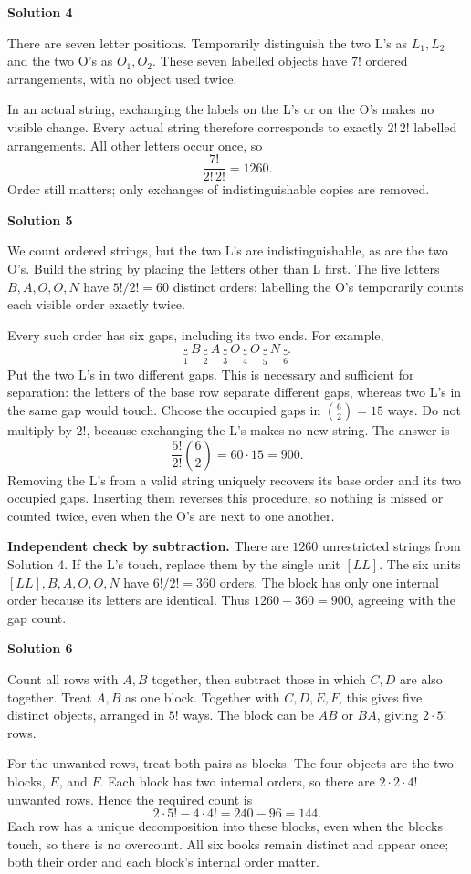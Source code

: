 \documentclass[11pt]{article}
\newcommand{\solution}[1]{%
  \par\Needspace{5\baselineskip}\addvspace{.8\baselineskip}%
  {\large\bfseries Solution #1\par}\nopagebreak[4]}
\begin{document}
\solution{4}
There are seven letter positions. Temporarily distinguish the two L's
as $L_1,L_2$ and the two O's as $O_1,O_2$. These seven labelled objects
have $7!$ ordered arrangements, with no object used twice.

In an actual string, exchanging the labels on the L's or on the O's
makes no visible change. Every actual string therefore corresponds to
exactly $2!\,2!$ labelled arrangements. All other letters occur once, so
\[
\frac{7!}{2!\,2!}=\boxed{1260}.
\]
Order still matters; only exchanges of indistinguishable copies are removed.



\clearpage
\solution{5}
We count ordered strings, but the two L's are indistinguishable, as are
the two O's. Build the string by placing the letters other than L first.
The five letters $B,A,O,O,N$ have $5!/2!=60$ distinct orders: labelling
the O's temporarily counts each visible order exactly twice.

Every such order has six gaps, including its two ends. For example,
\[
\underbrace{\square}_{1}\ B\
\underbrace{\square}_{2}\ A\
\underbrace{\square}_{3}\ O\
\underbrace{\square}_{4}\ O\
\underbrace{\square}_{5}\ N\
\underbrace{\square}_{6}.
\]
Put the two L's in two different gaps. This is necessary and sufficient
for separation: the letters of the base row separate different gaps,
whereas two L's in the same gap would touch. Choose the occupied gaps in
$\binom62=15$ ways. Do not multiply by $2!$, because exchanging the L's
makes no new string. The answer is
\[
\frac{5!}{2!}\binom62=60\cdot15=\boxed{900}.
\]
Removing the L's from a valid string uniquely recovers its base order
and its two occupied gaps. Inserting them reverses this procedure, so
nothing is missed or counted twice, even when the O's are next to one
another.

\textbf{Independent check by subtraction.} There are $1260$ unrestricted
strings from Solution 4. If the L's touch, replace them by the single
unit $[LL]$. The six units $[LL],B,A,O,O,N$ have $6!/2!=360$ orders.
The block has only one internal order because its letters are identical.
Thus $1260-360=900$, agreeing with the gap count.

\solution{6}
Count all rows with $A,B$ together, then subtract those in which $C,D$
are also together. Treat $A,B$ as one block. Together with $C,D,E,F$,
this gives five distinct objects, arranged in $5!$ ways. The block can
be $AB$ or $BA$, giving $2\cdot5!$ rows.

For the unwanted rows, treat both pairs as blocks. The four objects
are the two blocks, $E$, and $F$. Each block has two internal orders,
so there are $2\cdot2\cdot4!$ unwanted rows. Hence the required count is
\[
2\cdot5!-4\cdot4!=240-96=\boxed{144}.
\]
Each row has a unique decomposition into these blocks, even when the
blocks touch, so there is no overcount. All six books remain distinct
and appear once; both their order and each block's internal order matter.
\end{document}
